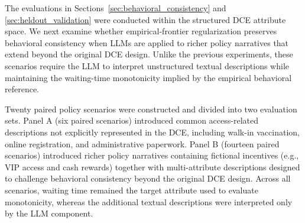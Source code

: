 \documentclass[11pt]{article}
\begin{document}
The evaluations in Sections~\ref{sec:behavioral_consistency} and \ref{sec:heldout_validation} were conducted within the structured DCE attribute space. We next examine whether empirical-frontier regularization preserves behavioral consistency when LLMs are applied to richer policy narratives that extend beyond the original DCE design. Unlike the previous experiments, these scenarios require the LLM to interpret unstructured textual descriptions while maintaining the waiting-time monotonicity implied by the empirical behavioral reference.

Twenty paired policy scenarios were constructed and divided into two evaluation sets. Panel A (six paired scenarios) introduced common access-related descriptions not explicitly represented in the DCE, including walk-in vaccination, online registration, and administrative paperwork. Panel B (fourteen paired scenarios) introduced richer policy narratives containing fictional incentives (e.g., VIP access and cash rewards) together with multi-attribute descriptions designed to challenge behavioral consistency beyond the original DCE design. Across all scenarios, waiting time remained the target attribute used to evaluate monotonicity, whereas the additional textual descriptions were interpreted only by the LLM component.
\end{document}
